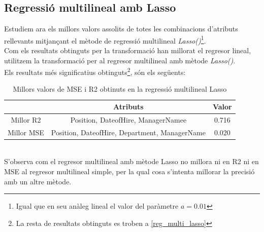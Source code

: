 \documentclass[a4paper, 11pt]{article}
\begin{document}
\subsection{Regressió multilineal amb Lasso}
Estudiem ara els millors valors assolits de totes les combinacions d'atributs rellevants mitjançant el mètode de regressió multilineal \textit{Lasso()}\footnote{Igual que en seu anàleg lineal el valor del paràmetre $a = 0.01$}.\\
Com els resultats obtinguts per la transformació han millorat el regresor lineal, utilitzem la transformació per al regresor multilineal amb mètode \textit{Lasso()}.
\\
Els resultats més significatius obtinguts\footnote{La resta de resultats obtinguts es troben a \textcolor{blue}{\ref{reg_multi_lasso}}}, són els següents:
\begin{table}[h]
    \centering
    \begin{tabular}{c||c|c}
        \cellcolor{white}{} & Atributs & Valor \\ \hline \hline
        Millor R2 & Position, DateofHire, ManagerNamee & 0.716 \\ \hline
        Millor MSE & Position, DateofHire, Department, ManagerName & $0.020$
    \end{tabular}
    \caption{Millors valors de MSE i R2 obtinuts en la regressió multilineal Lasso}
    \label{tab:my_label}
\end{table}\\
S'observa com el regresor multilineal amb mètode Lasso no millora ni en R2 ni en MSE al regresor multilineal simple, per la qual cosa s'intenta millorar la precisió amb un altre mètode.
\end{document}
